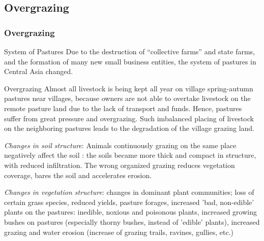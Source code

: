 \documentclass[pdflatex,compress,8pt,
	xcolor={dvipsnames,dvipsnames,svgnames,x11names,table},
	hyperref={colorlinks = true,
	breaklinks = true, 
	urlcolor = NavyBlue, 
	breaklinks = true}]{beamer}
\begin{document}
\subsection{Overgrazing}
\begin{frame}\frametitle{Overgrazing}

\begin{alertblock}{System of Pastures}
Due to the destruction of “collective farms” and state farms, and the formation of many new small business entities, the system of pastures in Central Asia changed.
\end{alertblock}

\begin{block}{Overgrazing}
Almost all livestock is being kept all year on village spring-autumn pastures near villages, because owners are not able to overtake livestock on the remote pasture land due to the lack of transport and funds. Hence, pastures suffer from great pressure and overgrazing. Such imbalanced placing of livestock on the neighboring pastures leads to the degradation of the village grazing land.
\end{block}

\begin{examples}{\emph{Changes in soil structure}:}
Animals continuously grazing on the same place negatively affect the soil : the soils became more thick and compact in structure, with reduced infiltration. The wrong organized grazing reduces vegetation coverage, bares the soil and accelerates erosion.
\end{examples}

\begin{examples}{\emph{Changes in vegetation structure}:}
changes in dominant plant communities; loss of certain grass species, reduced yields, pasture forages, increased 'bad, non-edible' plants on the pastures: inedible, noxious and poisonous plants, increased growing bushes on pastures (especially thorny bushes, instead of 'edible' plants), increased grazing and water erosion (increase of grazing trails, ravines, gullies, etc.)

\end{examples}

\end{frame}
\end{document}
